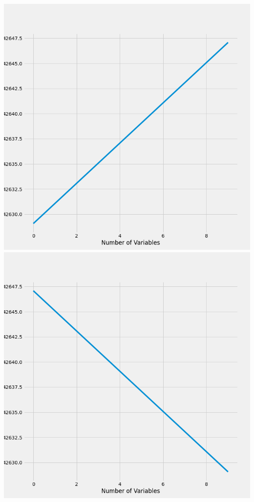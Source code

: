 \documentclass{article}
\begin{document}
	\includegraphics[scale = 0.2]{../plots/python/AICAutoForwardPCP.png} 
	\includegraphics[scale = 0.2]{../plots/python/AICBackwardPCP.png}
\end{document}
